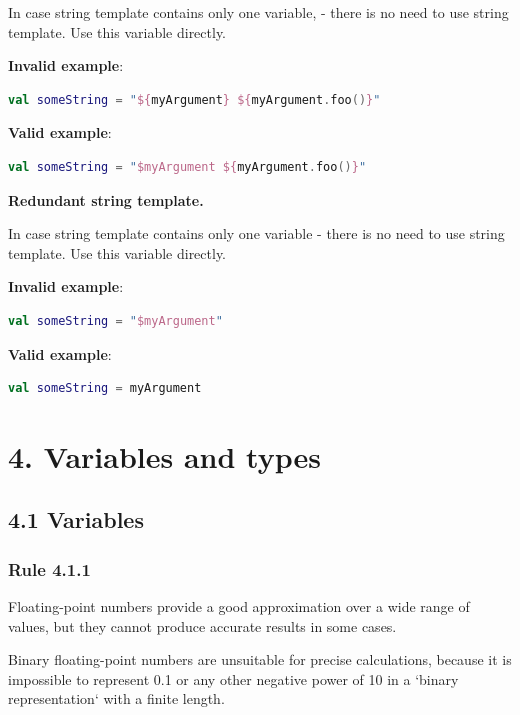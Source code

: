 {{{{In case string template contains only one variable, - there is no need to use string template. Use this variable directly.

\textbf{Invalid example}:

\begin{lstlisting}[language=Kotlin]
val someString = "${myArgument} ${myArgument.foo()}"
\end{lstlisting}


\textbf{Valid example}:

\begin{lstlisting}[language=Kotlin]
val someString = "$myArgument ${myArgument.foo()}"
\end{lstlisting}


\textbf{Redundant string template.}

In case string template contains only one variable - there is no need to use string template. Use this variable directly.



\textbf{Invalid example}:

\begin{lstlisting}[language=Kotlin]
val someString = "$myArgument"
\end{lstlisting}


\textbf{Valid example}:

\begin{lstlisting}[language=Kotlin]
val someString = myArgument
\end{lstlisting}
\section*{\textbf{4. Variables and types}}

\subsection*{\textbf{4.1 Variables}}

\subsubsection*{\textbf{Rule 4.1.1}}
\leavevmode\newline

Floating-point numbers provide a good approximation over a wide range of values, but they cannot produce accurate results in some cases.

Binary floating-point numbers are unsuitable for precise calculations, because it is impossible to represent 0.1 or any other negative power of 10 in a `binary representation` with a finite length.



}}}}
